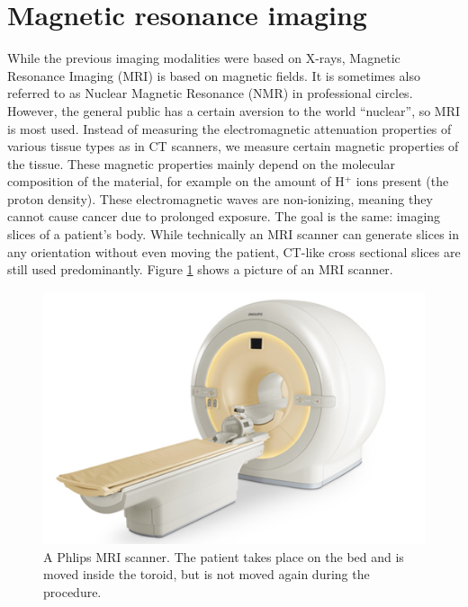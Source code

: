 \section{Magnetic resonance imaging}\label{sec:mri}
While the previous imaging modalities were based on X-rays, Magnetic Resonance
Imaging (MRI) is based on magnetic fields. It is sometimes also referred to as
Nuclear Magnetic Resonance (NMR) in professional circles. However, the general
public has a certain aversion to the world ``nuclear'', so MRI is most used.
Instead of measuring the electromagnetic attenuation properties of various
tissue types as in CT scanners, we measure certain magnetic properties of the
tissue. These magnetic properties mainly depend on the molecular composition of
the material, for example on the amount of H$^+$ ions present (the proton
density). These electromagnetic waves are non-ionizing, meaning they cannot
cause cancer due to prolonged exposure. The goal is the same: imaging slices of
a patient's body. While technically an MRI scanner can generate slices in any
orientation without even moving the patient, CT-like cross sectional slices
are still used predominantly. Figure \ref{fig:mriscanner} shows a picture of an MRI
scanner.

\begin{figure}[ht]
\begin{center}
  \includegraphics[width=\linewidth]{img/mriscanner.jpg}
  \caption{A Phlips MRI scanner. The patient takes place on the bed and is
  moved inside the toroid, but is not moved again during the procedure.}
  \label{fig:mriscanner}
\end{center}
\end{figure}

